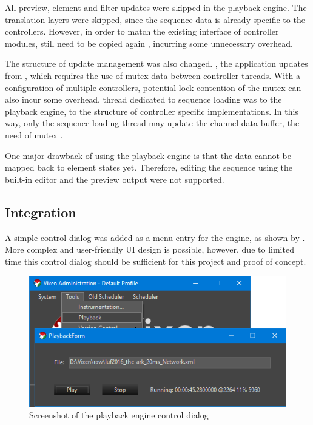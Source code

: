 All preview, element and filter updates were skipped in the playback engine. The translation layers were skipped, since the sequence data is already specific to the controllers. However, in order to match the existing interface of controller modules,  still need to be copied again , incurring some unnecessary overhead.

The structure of update management was also changed. , the application updates  from , which requires the use of mutex  data  between controller threads. With a configuration  of multiple controllers, potential lock contention of the mutex can also incur some overhead.  thread dedicated to sequence loading was  to the playback engine,  to the structure of controller specific implementations. In this way, only the sequence loading thread may update the channel data buffer,  the need of mutex .


One major drawback of using the playback engine is that the  data cannot be mapped back to element states yet. Therefore, editing the  sequence using the built-in editor and the preview output were not supported.

\subsection{Integration}

A simple control dialog was added as a menu entry for the  engine, as shown by . More complex and user-friendly UI design is possible, however, due to limited time  this control dialog should be sufficient for this project and proof of concept.

\begin{figure}[t]
  \centering
  \includegraphics[width=0.8\columnwidth]{Figs/vixen_playback.png}
  \caption{\footnotesize Screenshot of the playback engine control dialog}
  \label{fig:vixen_playback}
\end{figure}

